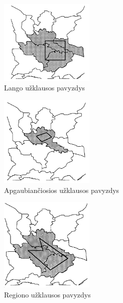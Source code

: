 \label{app:windowQuery}
\begin{figure}[H]
\begin{center}
\includegraphics[width=0.4\textwidth]{img/WindowQuery.png}
\caption{Lango užklausos pavyzdys}
\end{center}
\end{figure}

\label{app:enclosureQuery}
\begin{figure}[H]
\begin{center}
\includegraphics[width=0.4\textwidth]{img/EnclosureQuery.png}
\caption{Apgaubiančiosios užklausos pavyzdys}
\end{center}
\end{figure}

\label{app:intersectionQuery}
\begin{figure}[H]
\begin{center}
\includegraphics[width=0.4\textwidth]{img/IntersectionQuery.png}
\caption{Regiono užklausos pavyzdys}
\end{center}
\end{figure}

